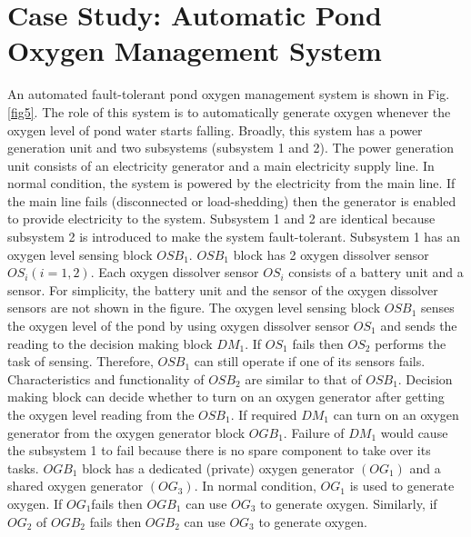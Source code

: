 \documentclass[10pt]{llncs}
\begin{document}
\section{Case Study: Automatic Pond Oxygen Management System}
\label{sec:3}
An automated fault-tolerant pond oxygen management system is shown in Fig.\ref{fig5}. The role of this system is to automatically generate oxygen whenever the oxygen level of pond water starts falling. Broadly, this system has a power generation unit and two subsystems (subsystem 1 and 2). The power generation unit consists of an electricity generator and a main electricity supply line. In normal condition, the system is powered by the electricity from the main line. If the main line fails (disconnected or load-shedding) then the generator is enabled to provide electricity to the system. Subsystem 1 and 2 are identical because subsystem 2 is introduced to make the system fault-tolerant. 
Subsystem 1 has an oxygen level sensing block ${OSB}_1$. ${OSB}_1$ block has 2 oxygen dissolver sensor ${OS}_i \left(i=1,2\right)$. Each oxygen dissolver sensor ${OS}_i$ consists of a battery unit and a sensor. For simplicity, the battery unit and the sensor of the oxygen dissolver sensors are not shown in the figure. The oxygen level sensing block ${OSB}_1$ senses the oxygen level of the pond by using oxygen dissolver sensor ${OS}_1$ and sends the reading to the decision making block ${DM}_1 $. If  ${OS}_1$ fails then ${OS}_2$  performs the task of sensing. Therefore, ${OSB}_1$ can still operate if one of its sensors fails. Characteristics and functionality of ${OSB}_2$ are similar to that of ${OSB}_1$. Decision making block can decide whether to turn on an oxygen generator after getting the oxygen level reading from the ${OSB}_1$. If required ${DM}_1$ can turn on an oxygen generator from the oxygen generator block ${OGB}_1$. Failure of ${DM}_1$ would cause the subsystem 1 to fail because there is no spare component to take over its tasks. ${OGB}_1$ block has a dedicated (private) oxygen generator $\left({OG}_1\right)$ and a shared oxygen generator $\left({OG}_3\right)$. In normal condition, ${OG}_1$ is used to generate oxygen. If  ${OG}_1$fails then  ${OGB}_1$ can use ${OG}_3$ to generate oxygen. Similarly, if ${OG}_2$ of ${OGB}_2$ fails then ${OGB}_2$ can use ${OG}_3$ to generate oxygen.   
\end{document}

